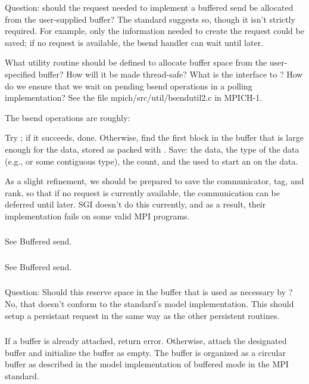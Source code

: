 \documentclass{article}
\begin{document}
Question: should the request needed to implement a buffered send be allocated
from the user-supplied buffer?  The standard suggests so, though it isn't
strictly required.  For example, only the information needed to create
the request could be saved; if no request is available, the bsend
handler can wait until later.

What utility routine should be defined to allocate buffer space from the
user-specified buffer?  How will it be made thread-safe?  What is the
interface to ?  How do we ensure that we wait on
pending bsend operations in a polling implementation?  See the file
mpich/src/util/bsendutil2.c in MPICH-1.

The bsend operations are roughly:
\begin{adi3}
Try ; if it succeeds, done.
Otherwise, find the first block in the buffer that is large enough for
the data, stored as packed with .  
Save: the data, the type of the data (e.g.,  or some
contiguous type), the count, and the  used to start
an  on the data.

As a slight refinement, we should be prepared to save the
communicator, tag, and rank, so that if no request is currently
available, the communication can be deferred until later.  SGI doesn't
do this currently, and as a result, their implementation fails on some
valid MPI programs.
\end{adi3}

\subsubsection{}
See Buffered send.

\subsubsection{}
See Buffered send.

\subsubsection{}
Question:  Should this reserve space in the buffer that is used as
necessary by ?  No, that doesn't conform to the
standard's model implementation.  This should setup a persistant
request in the same way as the other persistent routines.

\subsubsection{}
\begin{adi3}
If a buffer is already attached, return error.
Otherwise, attach the designated buffer and initialize the buffer as empty.
The buffer is organized as a circular buffer as described in the model
implementation of buffered mode in the MPI standard.
\end{adi3}
\end{document}
